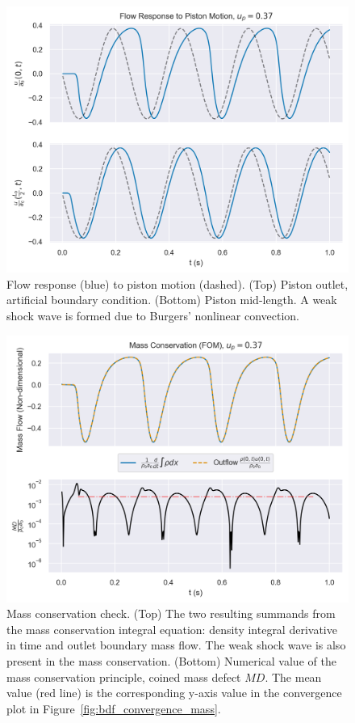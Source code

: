 \documentclass[../../thesis.tex]{subfiles}
\begin{document}
\begin{figure}[h]
    \includegraphics[width=\columnwidth]{research_project/piston/figures/fom_response/probes_online_fom_0.png}
    \caption{Flow response (blue) to piston motion (dashed).
    (Top) Piston outlet, artificial boundary condition.
    (Bottom) Piston mid-length.
    A weak shock wave is formed due to Burgers' nonlinear convection.}
    \label{fig:fom_probes}
\end{figure}

\begin{figure}[h]
    \includegraphics[width=\columnwidth]{research_project/piston/figures/fom_response/mass_conservation_online_fom_0.png}
    \caption{Mass conservation check. 
    (Top) The two resulting summands from the mass conservation integral equation:
    density integral derivative in time and outlet boundary mass flow.
    The weak shock wave is also present in the mass conservation. 
    (Bottom) Numerical value of the mass conservation principle, coined mass defect $MD$.
    The mean value (red line) is the corresponding y-axis value 
    in the convergence plot in Figure~\ref{fig:bdf_convergence_mass}.}
    \label{fig:fom_probes_mass_conservation}
\end{figure}
\end{document}
